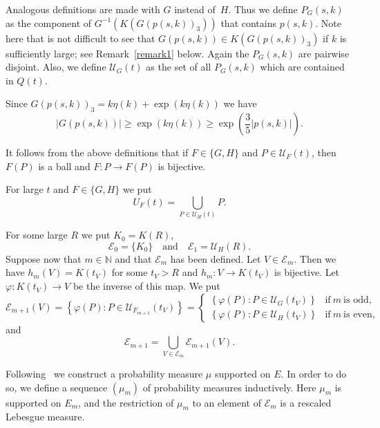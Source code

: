 \documentclass[12pt,a4paper]{amsart}
\theoremstyle{plain}
\theoremstyle{definition}
\theoremstyle{remark}
\def\N{\mathbb N}
\def\cE{\mathcal E}
\def\cU{\mathcal U}
\numberwithin{equation}{section}
\begin{document}
Analogous definitions are made with $G$ instead of~$H$. Thus we define $P_G(s,k)$
as the component of $G^{-1}(K(G(p(s,k))_3))$ that contains $p(s,k)$.
Note here that is not difficult to see that $G(p(s,k))\in K(G(p(s,k))_3)$
if $k$ is sufficiently large; see Remark~\ref{remark1} below.
Again the $P_G(s,k)$ are pairwise disjoint.
Also,  we define
$\cU_G(t)$ as the set of all $P_G(s,k)$ which are contained in $Q(t)$.

Since $G(p(s,k))_3=k\eta(k)+\exp(k\eta(k))$ we have 
\begin{equation}\label{3d2}
|G(p(s,k))|\geq \exp(k\eta(k))\geq \exp\!\left(\frac35 |p(s,k)|\right).
\end{equation}

It follows from the above definitions 
that if $F\in\{G,H\}$ and $P\in \cU_F(t)$, then $F(P)$ is a ball and
$F\colon P\to F(P)$ is bijective.

For large $t$ and $F\in\{G,H\}$ we put
\begin{equation}\label{3e1}
U_F(t)=\bigcup_{P\in \cU_H(t)} P.
\end{equation}

For some large  $R$ we put $K_0=K(R)$,
\begin{equation}\label{3e}
\cE_0=\{ K_0\}
\quad \text{and} \quad
\cE_1= \cU_H(R) .
\end{equation}
Suppose now that $m\in\N$ and that $\cE_m$ has been defined.
Let $V\in \cE_m$.
Then we have $h_m(V)=K(t_V)$ for some $t_V>R$ and $h_m\colon V\to K(t_V)$ is bijective.
Let $\varphi\colon K(t_V)\to V$ be the inverse of this map.
We put 
\begin{equation}\label{3f}
\cE_{m+1}(V)=
\left\{\varphi(P)\colon P\in \cU_{F_{m+1}}(t_V) \right\} 
=
\begin{cases}
\left\{\varphi(P)\colon P\in \cU_G(t_V) \right\} 
 & \text{if}\ m \ \text{is odd},\\
\left\{\varphi(P)\colon P\in \cU_H(t_V) \right\} 
 & \text{if}\ m \ \text{is even},
\end{cases}
\end{equation}
and
\begin{equation}\label{3g}
\cE_{m+1}=\bigcup_{V\in \cE_m} \cE_{m+1}(V).
\end{equation}

Following~\cite{McMullen1987} we construct a
probability measure $\mu$ supported on $E$.
In order to do so, we define  a sequence $(\mu_m)$ of 
probability measures inductively. Here $\mu_m$ is supported on $E_m$,
and the restriction of $\mu_m$ to an element of $\cE_m$ is
a rescaled Lebesgue measure.
\end{document}
